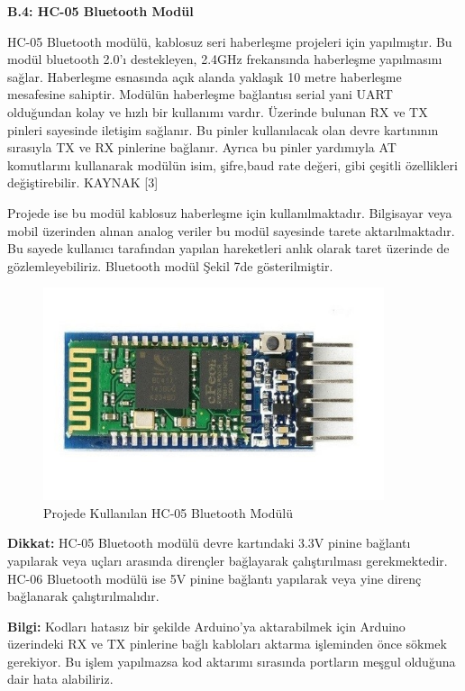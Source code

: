 \textbf{B.4: HC-05 Bluetooth Modül}
\label{YedinciBolum}

	HC-05 Bluetooth modülü,  kablosuz seri haberleşme projeleri için yapılmıştır. Bu modül bluetooth 2.0’ı destekleyen, 2.4GHz frekansında haberleşme yapılmasını sağlar. Haberleşme esnasında açık alanda yaklaşık 10 metre haberleşme mesafesine sahiptir. Modülün haberleşme bağlantısı serial yani UART olduğundan kolay ve hızlı bir kullanımı vardır. Üzerinde bulunan RX ve TX pinleri sayesinde iletişim sağlanır. Bu pinler kullanılacak olan devre kartınının sırasıyla TX ve RX pinlerine bağlanır. Ayrıca bu pinler yardımıyla AT komutlarını kullanarak modülün isim, şifre,baud rate değeri, gibi çeşitli özellikleri değiştirebilir. KAYNAK [3]
    
	Projede ise bu modül kablosuz haberleşme için kullanılmaktadır. Bilgisayar veya mobil üzerinden alınan analog veriler bu modül sayesinde tarete aktarılmaktadır. Bu sayede kullanıcı tarafından yapılan hareketleri anlık olarak taret üzerinde de gözlemleyebiliriz. Bluetooth modül Şekil 7de gösterilmiştir.

\begin{figure}[H]
	\centering
	\includegraphics[width=100mm]{grafik/Bluetooth.jpg}
    \caption{Projede Kullanılan HC-05 Bluetooth Modülü}
	\label{fig:BluetoothDM}
\end{figure}

\textbf{Dikkat:} HC-05 Bluetooth modülü devre kartındaki 3.3V pinine bağlantı yapılarak veya uçları arasında dirençler bağlayarak çalıştırılması gerekmektedir. HC-06 Bluetooth modülü ise 5V pinine bağlantı yapılarak veya yine direnç bağlanarak çalıştırılmalıdır.

\textbf{Bilgi:} Kodları hatasız bir şekilde Arduino’ya aktarabilmek için Arduino üzerindeki RX ve TX pinlerine bağlı kabloları aktarma işleminden önce sökmek gerekiyor. Bu işlem yapılmazsa kod aktarımı sırasında portların meşgul olduğuna dair hata alabiliriz. 

\clearpage